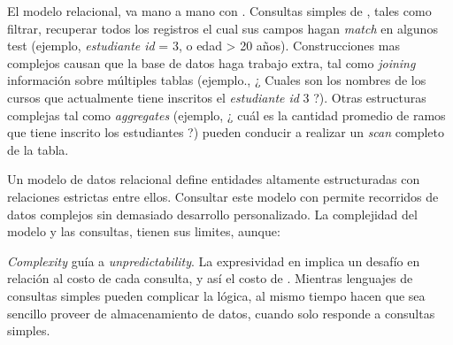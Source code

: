 El modelo relacional, va mano a mano con . Consultas simples de , tales como filtrar, recuperar todos los registros el cual sus campos hagan \textit{match} en algunos test (ejemplo, \textit{estudiante id} = 3, o edad > 20 años). Construcciones mas complejos causan que la base de datos haga trabajo extra, tal como \textit{joining} información sobre múltiples tablas (ejemplo., ¿ Cuales son los nombres de los cursos que actualmente tiene inscritos el \textit{estudiante id} 3 ?). Otras estructuras complejas tal como \textit{aggregates} (ejemplo, ¿ cuál es la cantidad promedio de ramos que tiene inscrito los estudiantes
?) pueden conducir a realizar un \textit{scan} completo de la tabla.


Un modelo de datos relacional define entidades altamente estructuradas con relaciones estrictas entre ellos. Consultar este modelo con  permite recorridos de datos complejos sin demasiado desarrollo personalizado. La complejidad del modelo y las consultas, tienen sus limites, aunque:


\textit{Complexity} guía a \textit{unpredictability}. La expresividad en  implica un desafío en relación al costo de cada consulta, y así el costo de \textit{}. Mientras lenguajes de consultas simples pueden complicar la lógica, al mismo tiempo hacen que sea sencillo proveer de almacenamiento de datos, cuando solo responde a consultas simples.


